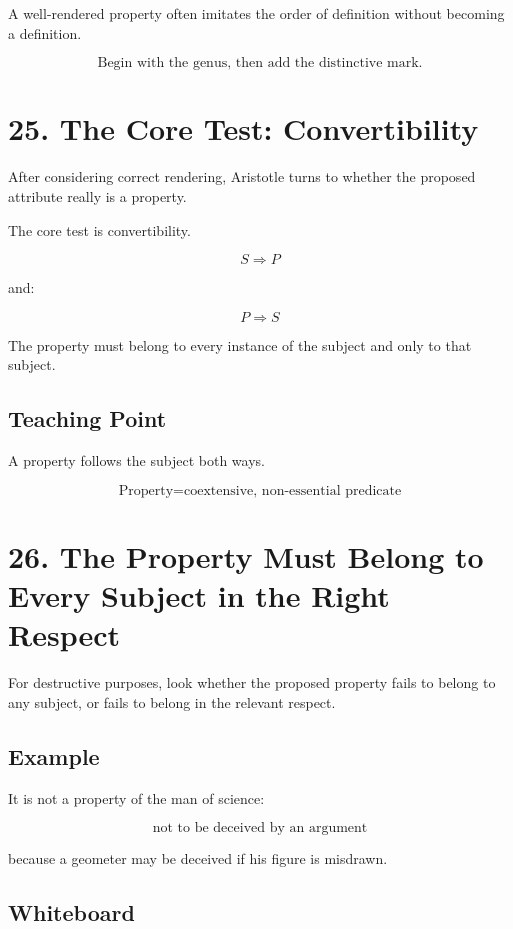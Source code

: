 \documentclass[12pt]{article}
\begin{document}
A well-rendered property often imitates the order of definition without becoming
a definition.

\[
\boxed{
\text{Begin with the genus, then add the distinctive mark.}
}
\]

\section*{25. The Core Test: Convertibility}

After considering correct rendering, Aristotle turns to whether the proposed
attribute really is a property.

The core test is convertibility.

\[
S \Rightarrow P
\]

and:

\[
P \Rightarrow S
\]

The property must belong to every instance of the subject and only to that
subject.

\subsection*{Teaching Point}

A property follows the subject both ways.

\[
\boxed{
\text{Property} = \text{coextensive, non-essential predicate}
}
\]

\section*{26. The Property Must Belong to Every Subject in the Right Respect}

For destructive purposes, look whether the proposed property fails to belong to
any subject, or fails to belong in the relevant respect.

\subsection*{Example}

It is not a property of the man of science:

\[
\text{not to be deceived by an argument}
\]

because a geometer may be deceived if his figure is misdrawn.

\subsection*{Whiteboard}
\end{document}
